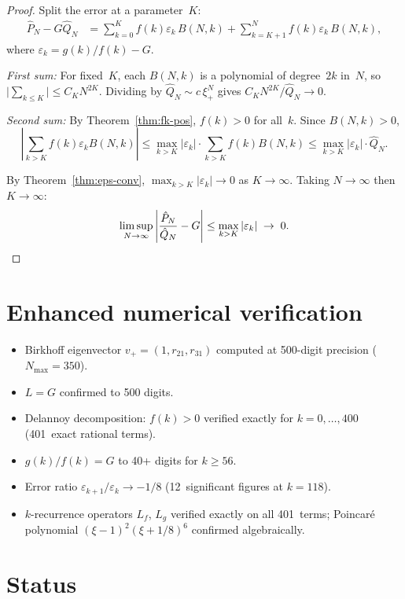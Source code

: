 \documentclass[11pt]{article}
\begin{document}
\begin{proof}
Split the error at a parameter~$K$:
\begin{align*}
\hat P_N - G\hat Q_N
&= \sum_{k=0}^{K} f(k)\varepsilon_k\,B(N,k)
 + \sum_{k=K+1}^{N} f(k)\varepsilon_k\,B(N,k),
\end{align*}
where $\varepsilon_k = g(k)/f(k) - G$.

\emph{First sum:} For fixed~$K$, each $B(N,k)$ is a polynomial
of degree~$2k$ in~$N$, so
$\bigl|\sum_{k\le K}\bigr| \le C_K N^{2K}$.
Dividing by $\hat Q_N \sim c\,\xi_+^N$ gives
$C_K N^{2K}/\hat Q_N \to 0$.

\emph{Second sum:} By Theorem~\ref{thm:fk-pos}, $f(k)>0$
for all~$k$.  Since $B(N,k)>0$,
\[
\left|\sum_{k>K} f(k)\varepsilon_k B(N,k)\right|
\le \max_{k>K}|\varepsilon_k|\cdot
\sum_{k>K} f(k)B(N,k)
\le \max_{k>K}|\varepsilon_k|\cdot \hat Q_N.
\]

By Theorem~\ref{thm:eps-conv},
$\max_{k>K}|\varepsilon_k| \to 0$ as $K\to\infty$.
Taking $N\to\infty$ then $K\to\infty$:
\[
\limsup_{N\to\infty}
\left|\frac{\hat P_N}{\hat Q_N} - G\right|
\le \max_{k>K}|\varepsilon_k| \;\to\; 0.
\qedhere
\]
\end{proof}



\section{Enhanced numerical verification}

\begin{itemize}
\item Birkhoff eigenvector $v_+ = (1, r_{21}, r_{31})$ computed
  at 500-digit precision ($N_{\max} = 350$).
\item $L = G$ confirmed to 500 digits.
\item Delannoy decomposition: $f(k)>0$ verified exactly for
  $k = 0, \ldots, 400$ (401~exact rational terms).
\item $g(k)/f(k) = G$ to 40+ digits for $k \ge 56$.
\item Error ratio $\varepsilon_{k+1}/\varepsilon_k \to -1/8$
  (12~significant figures at $k=118$).
\item $k$-recurrence operators $L_f$, $L_g$ verified exactly on
  all 401~terms; Poincar\'e polynomial
  $(\xi-1)^2(\xi+1/8)^6$ confirmed algebraically.
\end{itemize}

\section{Status}
\end{document}
